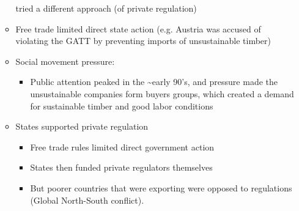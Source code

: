 \documentclass[11pt]{article}
\begin{document}
\begin{itemize}
\begin{itemize}
tried a different approach (of private regulation)
\item Free trade limited direct state action (e.g. Austria was accused of
violating the GATT by preventing imports of unsustainable timber)
\item Social movement pressure:
\begin{itemize}
\item Public attention peaked in the \textasciitilde{}early 90's, and pressure made the
unsustainable companies form buyers groups, which created a demand for
sustainable timber and good labor conditions
\end{itemize}
\item States supported private regulation
\begin{itemize}
\item Free trade rules limited direct government action
\item States then funded private regulators themselves
\item But poorer countries that were exporting were opposed to regulations
(Global North-South conflict).
\end{itemize}
\end{itemize}
\end{itemize}
\end{document}
